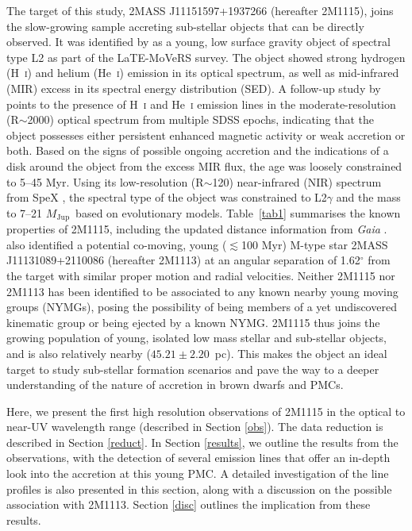 \documentclass{aa}
\newcommand{\mj}{\ensuremath{M_\mathrm{Jup}}\xspace}
\newcommand{\Hi}{H~\textsc{i}\xspace}
\newcommand{\Hei}{He~\textsc{i}\xspace}
\begin{document}
The target of this study, 2MASS J11151597+1937266 (hereafter 2M1115), joins the slow-growing sample accreting sub-stellar objects that can be directly observed. It was identified by \cite{theissen2017} as a young, low surface gravity object of spectral type L2 as part of the LaTE-MoVeRS survey. The object showed strong hydrogen (\Hi) and helium (\Hei) emission in its optical spectrum, as well as mid-infrared (MIR) excess in its spectral energy distribution (SED). A follow-up study by \cite{theissen2018} points to the presence of \Hi and \Hei emission lines in the moderate-resolution (R$\sim$2000) optical spectrum from multiple SDSS \citep[Sloan Digital Sky Survey;][]{sdss} epochs, indicating that the object possesses either persistent enhanced magnetic activity or weak accretion or both. Based on the signs of possible ongoing accretion and the indications of a disk around the object from the excess MIR flux, the age was loosely constrained to 5--45 Myr. Using its low-resolution (R$\sim$120) near-infrared (NIR) spectrum from SpeX \citep{spex}, the spectral type of the object was constrained to L2$\gamma$ and the mass to 7--21 \mj~based on evolutionary models. Table~\ref{tab1} summarises the known properties of 2M1115, including the updated distance information from \textit{Gaia} \citep[object ID: Gaia DR3 3990192705824438144;][]{gaiadr3}. \cite{theissen2018} also identified a potential co-moving, young ($\lesssim$100 Myr) M-type star 2MASS J11131089+2110086 (hereafter 2M1113) at an angular separation of 1.62$^{\circ}$ from the target with similar proper motion and radial velocities. Neither 2M1115 nor 2M1113 has been identified to be associated to any known nearby young moving groups (NYMGs), posing the possibility of being members of a yet undiscovered kinematic group or being ejected by a known NYMG. 2M1115 thus joins the growing population of young, isolated low mass stellar and sub-stellar objects, and is also relatively nearby ($45.21\pm2.20$~pc). This makes the object an ideal target to study sub-stellar formation scenarios and pave the way to a deeper understanding of the nature of accretion in brown dwarfs and PMCs.

Here, we present the first high resolution observations of 2M1115 in the optical to near-UV wavelength range (described in Section \ref{obs}). The data reduction is described in Section \ref{reduct}. In Section \ref{results}, we outline the results from the observations, with the detection of several emission lines that offer an in-depth look into the accretion at this young PMC. A detailed investigation of the line profiles is also presented in this section, along with a discussion on the possible association with 2M1113. Section \ref{disc} outlines the implication from these results.
\end{document}
